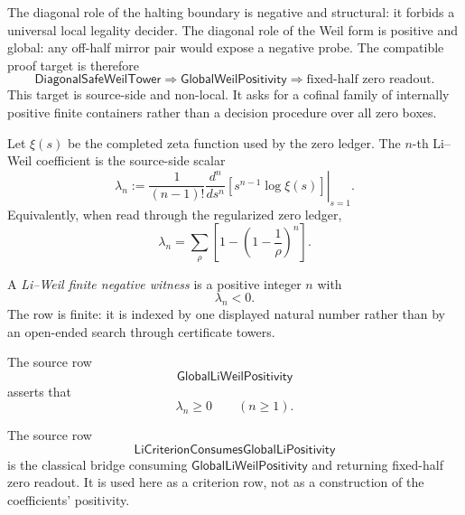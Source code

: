 \begin{principle}
\label{prin:rh-diagonal-safe-final-target}
The diagonal role of the halting boundary is negative and structural: it
forbids a universal local legality decider.  The diagonal role of the
Weil form is positive and global: any off-half mirror pair would expose
a negative probe.  The compatible proof target is therefore
$$
\mathsf{DiagonalSafeWeilTower}
\Longrightarrow
\mathsf{GlobalWeilPositivity}
\Longrightarrow
\text{fixed-half zero readout}.
$$
This target is source-side and non-local.  It asks for a cofinal family
of internally positive finite containers rather than a decision
procedure over all zero boxes.
\end{principle}

\begin{definition}
\label{def:rh-li-weil-coefficient-row}
Let $\xi(s)$ be the completed zeta function used by the zero ledger.  The
$n$-th Li--Weil coefficient is the source-side scalar
$$
\lambda_n
:=
\frac{1}{(n-1)!}
\left.
\frac{d^n}{ds^n}
\left[
s^{n-1}\log \xi(s)
\right]
\right|_{s=1}.
$$
Equivalently, when read through the regularized zero ledger,
$$
\lambda_n
=
\sum_{\rho}
\left[
1-\left(1-\frac1{\rho}\right)^n
\right].
$$
\end{definition}

\begin{definition}
\label{def:rh-li-weil-finite-negative-witness}
A \emph{Li--Weil finite negative witness} is a positive integer $n$ with
$$
\lambda_n<0.
$$
The row is finite: it is indexed by one displayed natural number rather
than by an open-ended search through certificate towers.
\end{definition}

\begin{definition}
\label{def:rh-global-li-weil-positivity}
The source row
$$
\mathsf{GlobalLiWeilPositivity}
$$
asserts that
$$
\lambda_n\ge0
\qquad
(n\ge1).
$$
\end{definition}

\begin{definition}
\label{def:rh-li-criterion-consumption-row}
The source row
$$
\mathsf{LiCriterionConsumesGlobalLiPositivity}
$$
is the classical bridge consuming
$\mathsf{GlobalLiWeilPositivity}$ and returning fixed-half zero readout.
It is used here as a criterion row, not as a construction of the
coefficients' positivity.
\end{definition}

